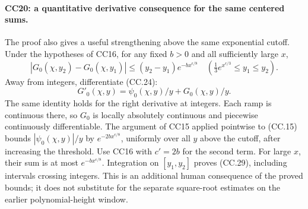 \paragraph{CC20: a quantitative derivative consequence for the same centered sums.}
The proof also gives a useful strengthening above the same
exponential cutoff. Under the hypotheses of CC16, for any
fixed $b>0$ and all sufficiently large $x$,
\[
 |G_0(\chi,y_2)-G_0(\chi,y_1)|
       \le (y_2-y_1)e^{-b x^{\epsilon/8}}
 \quad\left(\tfrac13e^{x^{\epsilon/3}}\le y_1\le y_2\right).
                                                               \tag{CC.29}
\]
Away from integers, differentiate (CC.24):
\[
           G'_0(\chi,y)=\psi_0(\chi,y)/y+G_0(\chi,y)/y.
\]
The same identity holds for the right derivative at integers.
Each ramp is continuous there, so $G_0$ is locally absolutely
continuous and piecewise continuously differentiable.
The argument of CC15 applied pointwise to (CC.15) bounds
$|\psi_0(\chi,y)|/y$ by $e^{-2b x^{\epsilon/8}}$, uniformly
over all $y$ above the cutoff, after increasing the threshold.
Use CC16 with $c'=2b$ for the second term. For large $x$,
their sum is at most $e^{-b x^{\epsilon/8}}$.
Integration on $[y_1,y_2]$ proves (CC.29), including intervals
crossing integers. This is an additional human consequence of
the proved bounds; it does not substitute for the separate
square-root estimates on the earlier polynomial-height window.

